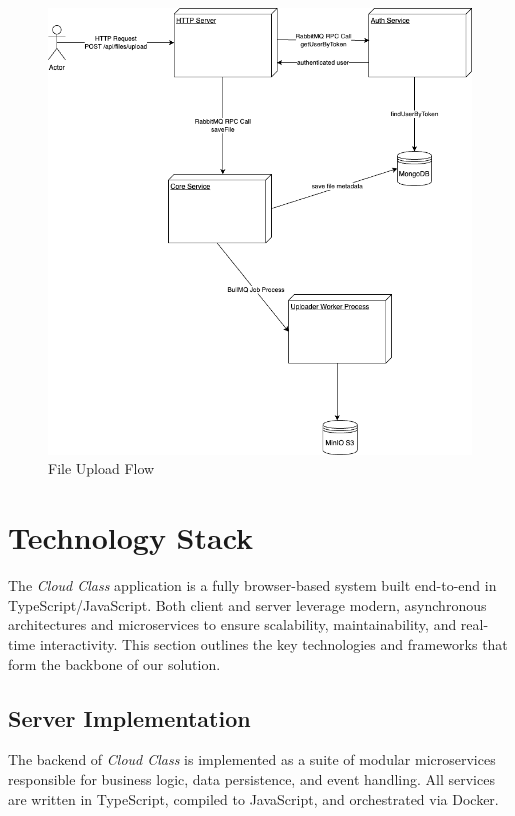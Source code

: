\begin{figure}[H]
\centering
\includegraphics[width=1\linewidth]{licenta-uploader.drawio.png}
\caption*{File Upload Flow}
\label{fig:file-upload-flow}
\end{figure}

\section{Technology Stack}

The \emph{Cloud Class} application is a fully browser-based system built end-to-end in TypeScript/JavaScript.  Both client and server leverage modern, asynchronous architectures and microservices to ensure scalability, maintainability, and real-time interactivity.  This section outlines the key technologies and frameworks that form the backbone of our solution.

\subsection{Server Implementation}

The backend of \emph{Cloud Class} is implemented as a suite of modular microservices responsible for business logic, data persistence, and event handling.  All services are written in \mbox{TypeScript}, compiled to JavaScript, and orchestrated via Docker.

